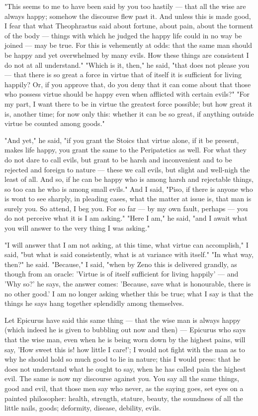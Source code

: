  "This seems to me to have been said by you too hastily — that all the wise are always happy; somehow the discourse flew past it. And unless this is made good, I fear that what Theophrastus said about fortune, about pain, about the torment of the body — things with which he judged the happy life could in no way be joined — may be true. For this is vehemently at odds: that the same man should be happy and yet overwhelmed by many evils. How these things are consistent I do not at all understand." "Which is it, then," he said, "that does not please you — that there is so great a force in virtue that of itself it is sufficient for living happily? Or, if you approve that, do you deny that it can come about that those who possess virtue should be happy even when afflicted with certain evils?" "For my part, I want there to be in virtue the greatest force possible; but how great it is, another time; for now only this: whether it can be so great, if anything outside virtue be counted among goods."

 "And yet," he said, "if you grant the Stoics that virtue alone, if it be present, makes life happy, you grant the same to the Peripatetics as well. For what they do not dare to call evils, but grant to be harsh and inconvenient and to be rejected and foreign to nature — these we call evils, but slight and well-nigh the least of all. And so, if he can be happy who is among harsh and rejectable things, so too can he who is among small evils." And I said, "Piso, if there is anyone who is wont to see sharply, in pleading cases, what the matter at issue is, that man is surely you. So attend, I beg you. For so far — by my own fault, perhaps — you do not perceive what it is I am asking." "Here I am," he said, "and I await what you will answer to the very thing I was asking."

 "I will answer that I am not asking, at this time, what virtue can accomplish," I said, "but what is said consistently, what is at variance with itself." "In what way, then?" he said. "Because," I said, "when by Zeno this is delivered grandly, as though from an oracle: 'Virtue is of itself sufficient for living happily' — and 'Why so?' he says, the answer comes: 'Because, save what is honourable, there is no other good.' I am no longer asking whether this be true; what I say is that the things he says hang together splendidly among themselves.

 Let Epicurus have said this same thing — that the wise man is always happy (which indeed he is given to bubbling out now and then) — Epicurus who says that the wise man, even when he is being worn down by the highest pains, will say, 'How sweet this is! how little I care!'; I would not fight with the man as to why he should hold so much good to lie in nature; this I would press: that he does not understand what he ought to say, when he has called pain the highest evil. The same is now my discourse against you. You say all the same things, good and evil, that those men say who never, as the saying goes, set eyes on a painted philosopher: health, strength, stature, beauty, the soundness of all the little nails, goods; deformity, disease, debility, evils.

